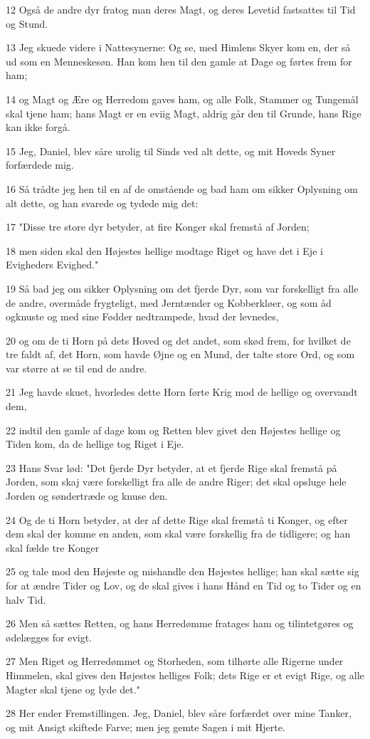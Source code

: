 \par 12 Også de andre dyr fratog man deres Magt, og deres Levetid fastsattes til Tid og Stund.
\par 13 Jeg skuede videre i Nattesynerne: Og se, med Himlens Skyer kom en, der så ud som en Menneskesøn. Han kom hen til den gamle at Dage og førtes frem for ham;
\par 14 og Magt og Ære og Herredom gaves ham, og alle Folk, Stammer og Tungemål skal tjene ham; hans Magt er en eviig Magt, aldrig går den til Grunde, hans Rige kan ikke forgå.
\par 15 Jeg, Daniel, blev såre urolig til Sinds ved alt dette, og mit Hoveds Syner forfærdede mig.
\par 16 Så trådte jeg hen til en af de omstående og bad ham om sikker Oplysning om alt dette, og han svarede og tydede mig det:
\par 17 "Disse tre store dyr betyder, at fire Konger skal fremstå af Jorden;
\par 18 men siden skal den Højestes hellige modtage Riget og have det i Eje i Evigheders Evighed."
\par 19 Så bad jeg om sikker Oplysning om det fjerde Dyr, som var forskelligt fra alle de andre, overmåde frygteligt, med Jerntænder og Kobberkløer, og som åd ogknuste og med sine Fødder nedtrampede, hvad der levnedes,
\par 20 og om de ti Horn på dets Hoved og det andet, som skød frem, for hvilket de tre faldt af, det Horn, som havde Øjne og en Mund, der talte store Ord, og som var større at se til end de andre.
\par 21 Jeg havde skuet, hvorledes dette Horn førte Krig mod de hellige og overvandt dem,
\par 22 indtil den gamle af dage kom og Retten blev givet den Højestes hellige og Tiden kom, da de hellige tog Riget i Eje.
\par 23 Hans Svar lød: "Det fjerde Dyr betyder, at et fjerde Rige skal fremstå på Jorden, som skaj være forskelligt fra alle de andre Riger; det skal opsluge hele Jorden og søndertræde og knuse den.
\par 24 Og de ti Horn betyder, at der af dette Rige skal fremstå ti Konger, og efter dem skal der komme en anden, som skal være forskellig fra de tidligere; og han skal fælde tre Konger
\par 25 og tale mod den Højeste og mishandle den Højestes hellige; han skal sætte sig for at ændre Tider og Lov, og de skal gives i hans Hånd en Tid og to Tider og en halv Tid.
\par 26 Men så sættes Retten, og hans Herredømme fratages ham og tilintetgøres og ødelægges for evigt.
\par 27 Men Riget og Herredømmet og Storheden, som tilhørte alle Rigerne under Himmelen, skal gives den Højestes helliges Folk; dets Rige er et evigt Rige, og alle Magter skal tjene og lyde det."
\par 28 Her ender Fremstillingen. Jeg, Daniel, blev såre forfærdet over mine Tanker, og mit Ansigt skiftede Farve; men jeg gemte Sagen i mit Hjerte.

